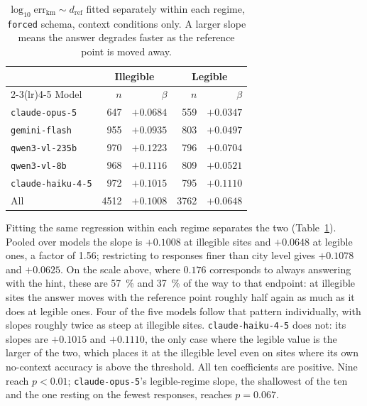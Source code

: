 \documentclass[10pt,a4paper]{article}
\newcommand{\errkm}{\ensuremath{\mathrm{err}_{\mathrm{km}}}}
\newcommand{\refkm}{\ensuremath{d_{\mathrm{ref}}}}
\begin{document}
\label{sec:dist-regime}
\begin{table}[!htbp]
\centering
\caption{$\log_{10}\errkm \sim \refkm$ fitted separately within each regime,
\texttt{forced} schema, context conditions only. A larger slope means the answer
degrades faster as the reference point is moved away.}
\label{tab:distregime}
\begin{tabular}{lrrrr}
\toprule
& \multicolumn{2}{c}{Illegible} & \multicolumn{2}{c}{Legible} \\
\cmidrule(lr){2-3}\cmidrule(lr){4-5}
Model & $n$ & $\beta$ & $n$ & $\beta$ \\
\midrule
\texttt{claude-opus-5}    & 647 & $+0.0684$ & 559 & $+0.0347$ \\
\texttt{gemini-flash}     & 955 & $+0.0935$ & 803 & $+0.0497$ \\
\texttt{qwen3-vl-235b}    & 970 & $+0.1223$ & 796 & $+0.0704$ \\
\texttt{qwen3-vl-8b}      & 968 & $+0.1116$ & 809 & $+0.0521$ \\
\texttt{claude-haiku-4-5} & 972 & $+0.1015$ & 795 & $+0.1110$ \\
\midrule
All                       & 4512 & $+0.1008$ & 3762 & $+0.0648$ \\
\bottomrule
\end{tabular}
\end{table}

Fitting the same regression within each regime separates the two
(Table~\ref{tab:distregime}). Pooled over models the slope is $+\num{0.1008}$ at illegible sites and
$+\num{0.0648}$ at legible ones, a factor of \num{1.56}; restricting to
responses finer than city level gives $+\num{0.1078}$ and $+\num{0.0625}$. On
the scale above, where $\num{0.176}$ corresponds to always
answering with the hint, these are \SI{57}{\percent} and \SI{37}{\percent} of
the way to that endpoint: at illegible sites the answer moves with the reference
point roughly half again as much as it does at legible ones. Four of the five
models follow that pattern individually, with slopes roughly twice as steep at
illegible sites. \texttt{claude-haiku-4-5} does not: its slopes are
$+\num{0.1015}$ and $+\num{0.1110}$, the only case where the legible value is
the larger of the two, which places it at the illegible level even on sites
where its own no-context accuracy is above the threshold. All ten coefficients are positive. Nine
reach $p < 0.01$; \texttt{claude-opus-5}'s legible-regime slope, the shallowest
of the ten and the one resting on the fewest responses, reaches
$p = \num{0.067}$.
\end{document}
